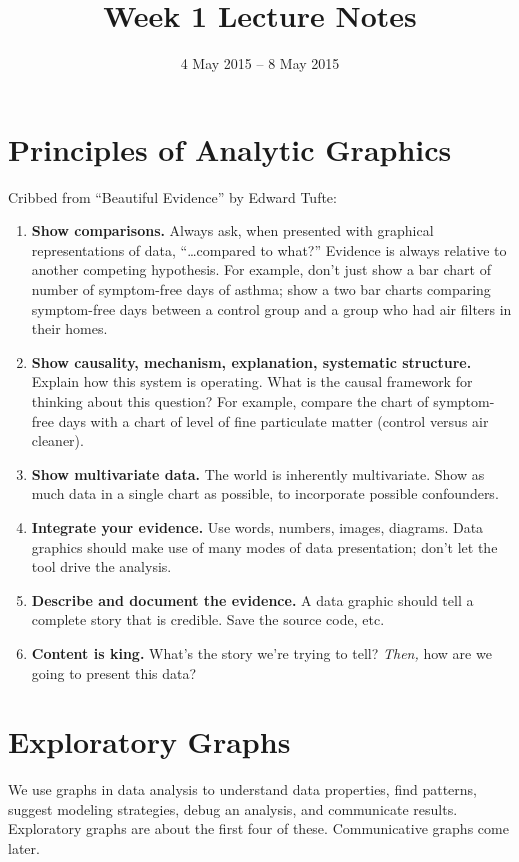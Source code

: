 
\title{Week 1 Lecture Notes}
\author{}
\date{4 May 2015 -- 8 May 2015}


\maketitle

\section{Principles of Analytic Graphics}
Cribbed from ``Beautiful Evidence'' by Edward Tufte:

\begin{enumerate}
  \item {\bf Show comparisons.} Always ask, when presented with graphical representations of data, ``\ldots compared to what?'' Evidence is always relative to another competing hypothesis. For example, don't just show a bar chart of number of symptom-free days of asthma; show a two bar charts comparing symptom-free days between a control group and a group who had air filters in their homes.
  \item {\bf Show causality, mechanism, explanation, systematic structure.} Explain how this system is operating. What is the causal framework for thinking about this question? For example, compare the chart of symptom-free days with a chart of level of fine particulate matter (control versus air cleaner).
  \item {\bf Show multivariate data.} The world is inherently multivariate. Show as much data in a single chart as possible, to incorporate possible confounders.
  \item {\bf Integrate your evidence.} Use words, numbers, images, diagrams. Data graphics should make use of many modes of data presentation; don't let the tool drive the analysis.
  \item {\bf Describe and document the evidence.} A data graphic should tell a complete story that is credible. Save the source code, etc.
  \item {\bf Content is king.} What's the story we're trying to tell? \emph{Then,} how are we going to present this data?
\end{enumerate}

\section{Exploratory Graphs}

We use graphs in data analysis to understand data properties, find patterns, suggest modeling strategies, debug an analysis, and communicate results. Exploratory graphs are about the first four of these. Communicative graphs come later.

